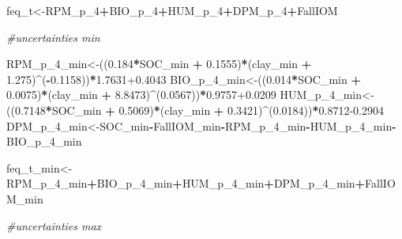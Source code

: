 \documentclass[
  10pt,
  b5paper,
]{book}
\newenvironment{Shaded}{\begin{snugshade}}{\end{snugshade}}
\newcommand{\CommentTok}[1]{\textcolor[rgb]{0.56,0.35,0.01}{\textit{#1}}}
\newcommand{\DecValTok}[1]{\textcolor[rgb]{0.00,0.00,0.81}{#1}}
\newcommand{\FloatTok}[1]{\textcolor[rgb]{0.00,0.00,0.81}{#1}}
\newcommand{\NormalTok}[1]{#1}
\newcommand{\OperatorTok}[1]{\textcolor[rgb]{0.81,0.36,0.00}{\textbf{#1}}}
\newcommand{\StringTok}[1]{\textcolor[rgb]{0.31,0.60,0.02}{#1}}
\begin{document}
\begin{Shaded}
\begin{Highlighting}[]
{\NormalTok{feq_t<-RPM_p_}\DecValTok{4}\OperatorTok{+}\NormalTok{BIO_p_}\DecValTok{4}\OperatorTok{+}\NormalTok{HUM_p_}\DecValTok{4}\OperatorTok{+}\NormalTok{DPM_p_}\DecValTok{4}\OperatorTok{+}\NormalTok{FallIOM}

\CommentTok{#uncertainties min}

\NormalTok{RPM_p_}\DecValTok{4}\NormalTok{_min<-((}\FloatTok{0.184}\OperatorTok{*}\NormalTok{SOC_min }\OperatorTok{+}\StringTok{ }\FloatTok{0.1555}\NormalTok{)}\OperatorTok{*}\NormalTok{(clay_min }\OperatorTok{+}\StringTok{ }\FloatTok{1.275}\NormalTok{)}\OperatorTok{^}\NormalTok{(}\OperatorTok{-}\FloatTok{0.1158}\NormalTok{))}\OperatorTok{*}\FloatTok{1.7631+0.4043}
\NormalTok{BIO_p_}\DecValTok{4}\NormalTok{_min<-((}\FloatTok{0.014}\OperatorTok{*}\NormalTok{SOC_min }\OperatorTok{+}\StringTok{ }\FloatTok{0.0075}\NormalTok{)}\OperatorTok{*}\NormalTok{(clay_min }\OperatorTok{+}\StringTok{ }\FloatTok{8.8473}\NormalTok{)}\OperatorTok{^}\NormalTok{(}\FloatTok{0.0567}\NormalTok{))}\OperatorTok{*}\FloatTok{0.9757+0.0209}
\NormalTok{HUM_p_}\DecValTok{4}\NormalTok{_min<-((}\FloatTok{0.7148}\OperatorTok{*}\NormalTok{SOC_min }\OperatorTok{+}\StringTok{ }\FloatTok{0.5069}\NormalTok{)}\OperatorTok{*}\NormalTok{(clay_min }\OperatorTok{+}\StringTok{ }\FloatTok{0.3421}\NormalTok{)}\OperatorTok{^}\NormalTok{(}\FloatTok{0.0184}\NormalTok{))}\OperatorTok{*}\FloatTok{0.8712-0.2904}
\NormalTok{DPM_p_}\DecValTok{4}\NormalTok{_min<-SOC_min}\OperatorTok{-}\NormalTok{FallIOM_min}\OperatorTok{-}\NormalTok{RPM_p_}\DecValTok{4}\NormalTok{_min}\OperatorTok{-}\NormalTok{HUM_p_}\DecValTok{4}\NormalTok{_min}\OperatorTok{-}\NormalTok{BIO_p_}\DecValTok{4}\NormalTok{_min}

\NormalTok{feq_t_min<-RPM_p_}\DecValTok{4}\NormalTok{_min}\OperatorTok{+}\NormalTok{BIO_p_}\DecValTok{4}\NormalTok{_min}\OperatorTok{+}\NormalTok{HUM_p_}\DecValTok{4}\NormalTok{_min}\OperatorTok{+}\NormalTok{DPM_p_}\DecValTok{4}\NormalTok{_min}\OperatorTok{+}\NormalTok{FallIOM_min}

\CommentTok{#uncertainties max}

}
\end{Highlighting}
\end{Shaded}
\end{document}
